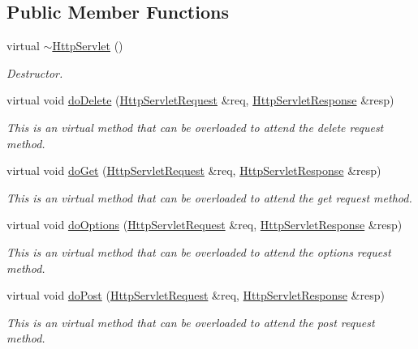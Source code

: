 \subsection*{Public Member Functions}
\begin{DoxyCompactItemize}
\item 
virtual \hyperlink{class_http_servlet_a912d39c84d82c498e0a5b319dcbe2be4}{$\sim$\+Http\+Servlet} ()
\begin{DoxyCompactList}\small\item\em Destructor. \end{DoxyCompactList}\item 
virtual void \hyperlink{class_http_servlet_a773a855260ff0977ae4c4a861008092c}{do\+Delete} (\hyperlink{class_http_servlet_request}{Http\+Servlet\+Request} \&req, \hyperlink{class_http_servlet_response}{Http\+Servlet\+Response} \&resp)
\begin{DoxyCompactList}\small\item\em This is an virtual method that can be overloaded to attend the delete request method. \end{DoxyCompactList}\item 
virtual void \hyperlink{class_http_servlet_a7c851e2989b7a61e5c8470b562690516}{do\+Get} (\hyperlink{class_http_servlet_request}{Http\+Servlet\+Request} \&req, \hyperlink{class_http_servlet_response}{Http\+Servlet\+Response} \&resp)
\begin{DoxyCompactList}\small\item\em This is an virtual method that can be overloaded to attend the get request method. \end{DoxyCompactList}\item 
virtual void \hyperlink{class_http_servlet_a1abc608f8ac9b682a59f2231775330c6}{do\+Options} (\hyperlink{class_http_servlet_request}{Http\+Servlet\+Request} \&req, \hyperlink{class_http_servlet_response}{Http\+Servlet\+Response} \&resp)
\begin{DoxyCompactList}\small\item\em This is an virtual method that can be overloaded to attend the options request method. \end{DoxyCompactList}\item 
virtual void \hyperlink{class_http_servlet_a6b94fb3bb052b2138ee673feb65e37c9}{do\+Post} (\hyperlink{class_http_servlet_request}{Http\+Servlet\+Request} \&req, \hyperlink{class_http_servlet_response}{Http\+Servlet\+Response} \&resp)
\begin{DoxyCompactList}\small\item\em This is an virtual method that can be overloaded to attend the post request method. \end{DoxyCompactList}\item 

\end{DoxyCompactItemize}
